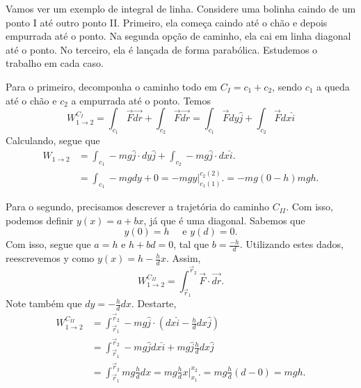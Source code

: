\documentclass[physics_notes.tex]{subfiles}
\begin{document}
\begin{example}
	Vamos ver um exemplo de integral de linha. Considere uma bolinha caindo de um ponto I até
	outro ponto II. Primeiro, ela começa caindo até o chão e depois empurrada até o ponto. Na segunda opção de caminho, ela cai em linha diagonal até o ponto. No terceiro,
	ela é lançada de forma parabólica. Estudemos o trabalho em cada caso.

	Para o primeiro, decomponha o caminho todo em \(C_{I} = c_{1} + c_{2}\), sendo
	\(c_{1}\) a queda até o chão e \(c_{2}\) a empurrada até o ponto. Temos
	\[
		W_{1\rightarrow 2 }^{C_{I}} = \int_{c_{1}}^{}\vec{F}\vec{dr} + \int_{c_{2}}^{}\vec{F}\vec{dr} = \int_{c_{1}}^{}\vec{F}dy \hat{j} + \int_{c_{2}}^{}\vec{F}dx \hat{i}
	\]
	Calculando, segue que
	\begin{align*}
		W_{1\rightarrow 2} & = \int_{c_{1}}^{}-mg \hat{j}\cdot dy \hat{j} + \int_{c_{2}}^{}-mg \hat{j}\cdot dx \hat{i}. \\
		                   & = \int_{c_{1}}^{}-mg dy + 0 = -mg y\biggl|_{c_{1}(1)}^{c_{2}(2)}\biggr. = -mg(0-h)mgh.
	\end{align*}

	Para o segundo, precisamos descrever a trajetória do caminho \(C_{II}\). Com isso,
	podemos definir \(y(x) = a + bx\), já que é uma diagonal. Sabemos que
	\[
		y(0) = h\quad\text{ e } y(d) = 0.
	\]
	Com isso, segue que \(a = h\) e \(h + bd = 0\), tal que \(b = \frac{-h}{d}.\) Utilizando estes dados,
	reescrevemos y como \(y(x) = h - \frac{h}{d}x\). Assim,
	\[
		W_{1\rightarrow 2}^{C_{II}} = \int_{\vec{r}_{1}}^{\vec{r}_{2}}\vec{F} \cdot \vec{dr}.
	\]
	Note também que \(dy = -\frac{h}{d}dx\). Destarte,
	\begin{align*}
		W_{1\rightarrow 2}^{C_{II}} & = \int_{\vec{r}_{1}}^{\vec{r}_{2}}-mg \hat{j}\cdot (dx \hat{i} - \frac{h}{d}dx \hat{j})                                           \\
		                            & = \int_{\vec{r}_{1}}^{\vec{r}_{2}}-mg \hat{j}dx \hat{i} + mg \hat{j}\frac{h}{d}dx \hat{j}                                         \\
		                            & = \int_{\vec{r}_{1}}^{\vec{r}_{2}}mg \frac{h}{d} dx = mg \frac{h}{d}x \biggl|_{x_{1}}^{x_{2}}\biggr. = mg \frac{h}{d}(d-0) = mgh.
	\end{align*}
\end{example}
\end{document}
